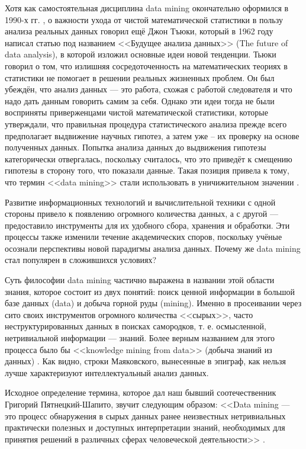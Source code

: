 Хотя как самостоятельная дисциплина data mining окончательно оформился в 1990-х гг. \cite[стр. 15]{handbook_stat_dm}, о важности ухода от чистой математической статистики в пользу анализа реальных данных говорил ещё Джон Тъюки, который в 1962 году написал статью под названием <<Будущее анализа данных>> (The future of data analysis), в которой изложил основные идеи новой тенденции. Тьюки говорил о том, что излишняя сосредоточенность на математических теориях в статистики не помогает в решении реальных жизненных проблем. Он был убеждён, что анализ данных --- это работа, схожая с работой следователя и что надо дать данным говорить самим за себя. Однако эти идеи тогда не были восприняты приверженцами чистой математической статистики, которые утверждали, что правильная процедура статистического анализа прежде всего предполагает выдвижение научных гипотез, а затем уже  -- их проверку на основе полученных данных. Попытка анализа данных до выдвижения гипотезы категорически отвергалась, поскольку считалось, что это приведёт к смещению гипотезы в сторону того, что показали данные. Такая позиция привела к тому, что термин <<data mining>> стали использовать в уничижительном значении \cite[стр. 788]{HandbookCS}.

Развитие информационных технологий и вычислительной техники с одной стороны привело к появлению огромного количества данных, а с другой --- предоставило инструменты для их удобного сбора, хранения и обработки. Эти процессы также изменили течение академических споров, поскольку учёные осознали перспективы новой парадигмы анализа данных. Почему же data mining стал популярен в сложившихся условиях?

Суть философии data mining частично выражена в названии этой области знания, которое состоит из двух понятий: поиск ценной информации в большой базе данных (data) и добыча горной руды (mining). Именно в просеивании через сито своих инструментов огромного количества <<сырых>>, часто неструктурированных данных в поисках самородков, т. е. осмысленной, нетривиальной информации --- знаний. Более верным названием для этого процесса было бы <<knowledge mining from data>> (добыча знаний из данных) \cite[стр. 5]{Han2006}. Как видно, строки Маяковского, вынесенные в эпиграф, как нельзя лучше характеризуют интеллектуальный анализ данных.

Исходное определение термина, которое дал наш бывший соотечественник Григорий Пятнецкий-Шапито, звучит следующим образом: <<Data mining --- это процесс обнаружения в сырых данных ранее неизвестных нетривиальных практически полезных и доступных интерпретации знаний, необходимых для принятия решений в различных сферах человеческой деятельности>> \cite[стр. 78]{Duk2011}.

